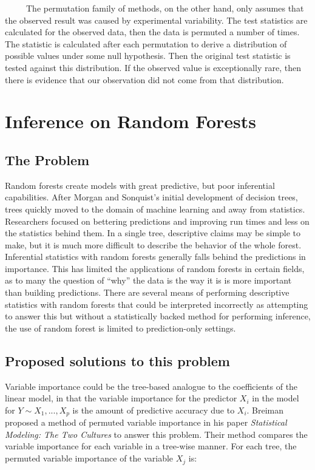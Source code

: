\documentclass[12pt,twoside]{reedthesis}
\begin{document}
  ~~~~~The permutation family of methods, on the other hand, only assumes
  that the observed result was caused by experimental variability. The
  test statistics are calculated for the observed data, then the data is
  permuted a number of times. The statistic is calculated after each
  permutation to derive a distribution of possible values under some null
  hypothesis. Then the original test statistic is tested against this
  distribution. If the observed value is exceptionally rare, then there is
  evidence that our observation did not come from that distribution.
  
  \section{Inference on Random Forests}\label{inference-on-random-forests}
  
  \subsection{The Problem}\label{the-problem}
  
  Random forests create models with great predictive, but poor inferential
  capabilities. After Morgan and Sonquist's initial development of
  decision trees, trees quickly moved to the domain of machine learning
  and away from statistics. Researchers focused on bettering predictions
  and improving run times and less on the statistics behind them. In a
  single tree, descriptive claims may be simple to make, but it is much
  more difficult to describe the behavior of the whole forest. Inferential
  statistics with random forests generally falls behind the predictions in
  importance. This has limited the applications of random forests in
  certain fields, as to many the question of ``why'' the data is the way
  it is is more important than building predictions. There are several
  means of performing descriptive statistics with random forests that
  could be interpreted incorrectly as attempting to answer this but
  without a statistically backed method for performing inference, the use
  of random forest is limited to prediction-only settings.
  
  \subsection{Proposed solutions to this
  problem}\label{proposed-solutions-to-this-problem}
  
  Variable importance could be the tree-based analogue to the coefficients
  of the linear model, in that the variable importance for the predictor
  \(X_i\) in the model for \(Y \sim X_1,...,X_p\) is the amount of
  predictive accuracy due to \(X_i\). Breiman proposed a method of
  permuted variable importance in his paper \emph{Statistical Modeling:
  The Two Cultures} to answer this problem. Their method compares the
  variable importance for each variable in a tree-wise manner. For each
  tree, the permuted variable importance of the variable \(X_j\) is:
  
\end{document}
